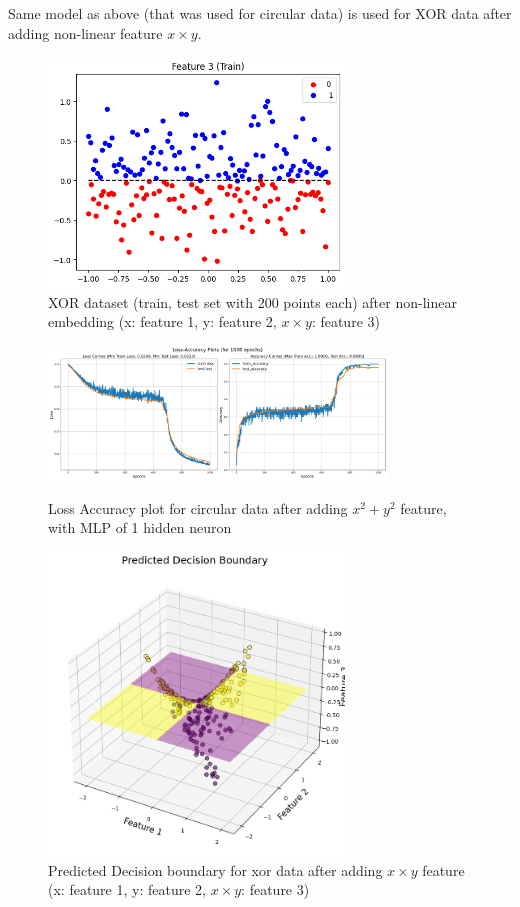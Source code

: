 \begin{solve} 
Same model as above (that was used for circular data) is used for XOR data after adding non-linear feature $x\times y$.


\begin{figure}
    \centering
    \includegraphics[width=0.7\textwidth]{plots/7_xor_transformation.png}
    \caption{XOR dataset (train, test set with 200 points each) after non-linear embedding (x: feature 1, y: feature 2, $x\times y$: feature 3)}
\end{figure}


\begin{figure}[H]
    \centering
    \includegraphics[width=0.8\textwidth]{plots/7_xor_loss_acc.png}
    \caption{Loss Accuracy plot for circular data after adding $x^2 + y^2$ feature, with MLP of 1 hidden neuron}

    \includegraphics[width=0.7\textwidth]{plots/7_xor_db.png}
    \caption{Predicted Decision boundary for xor data after adding $x\times y$ feature (x: feature 1, y: feature 2, $x\times y$: feature 3)}
\end{figure}

\end{solve}

